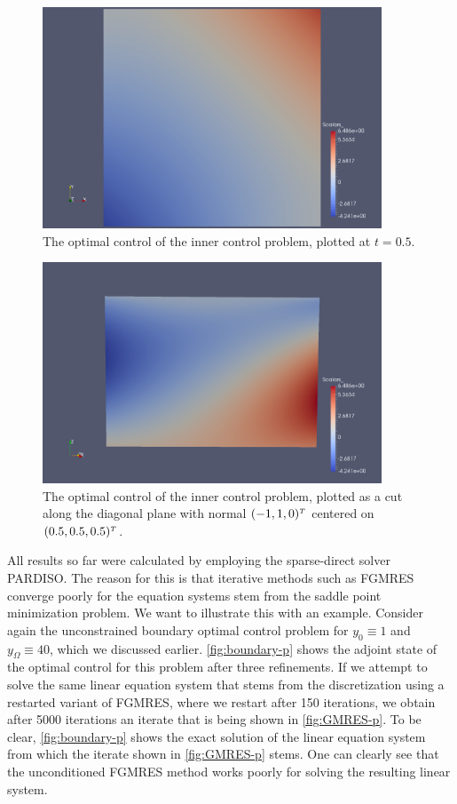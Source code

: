 \documentclass[../thesis.tex]{subfiles}
\begin{document}
\begin{figure}[htpb]
\centering
\includegraphics[width=0.9\textwidth]{Images/inner-u-cut-midtime.png}
\caption{The optimal control of the inner control problem, plotted at $t = 0.5$.}
\label{fig:inner-u-midtime}
\end{figure}
\begin{figure}[htpb]
\centering
\includegraphics[width=0.9\textwidth]{Images/inner-u-cut-diag.png}
\caption{The optimal control of the inner control problem, plotted as a cut along the diagonal plane with normal $(-1, 1, 0)^\tp$ centered on $(0.5, 0.5, 0.5)^\tp$.}
\label{fig:inner-u-diag}
\end{figure}
\FloatBarrier

All results so far were calculated by employing the sparse-direct solver PARDISO.
The reason for this is that iterative methods such as FGMRES converge poorly for the equation systems stem from the saddle point minimization problem.
We want to illustrate this with an example.
Consider again the unconstrained boundary optimal control problem for $y_0 \equiv 1$ and $y_\Omega \equiv 40$, which we discussed earlier.
\cref{fig:boundary-p} shows the adjoint state of the optimal control for this problem after three refinements.
If we attempt to solve the same linear equation system that stems from the discretization using a restarted variant of FGMRES, where we restart after 150 iterations, we obtain after 5000 iterations an iterate that is being shown in \cref{fig:GMRES-p}.
To be clear, \cref{fig:boundary-p} shows the exact solution of the linear equation system from which the iterate shown in \cref{fig:GMRES-p} stems.
One can clearly see that the unconditioned FGMRES method works poorly for solving the resulting linear system.
\end{document}
